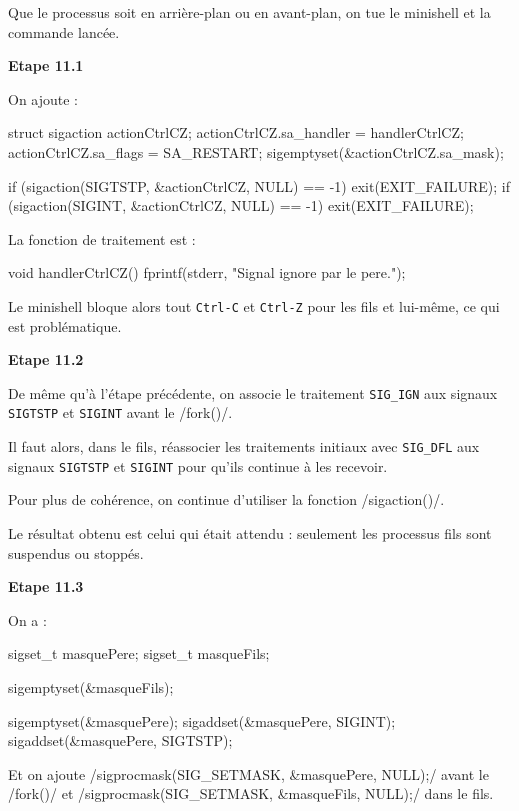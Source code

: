 \documentclass[a4paper, 12pt]{article}
\begin{document}
\bigskip
Que le processus soit en arrière-plan ou en avant-plan, on tue le minishell et la commande lancée.

\newpage
\noindent
\textbf{Etape 11.1}

\bigskip
On ajoute :

\begin{ccode}
struct sigaction actionCtrlCZ;
actionCtrlCZ.sa_handler = handlerCtrlCZ;
actionCtrlCZ.sa_flags = SA_RESTART;
sigemptyset(&actionCtrlCZ.sa_mask);

if (sigaction(SIGTSTP, &actionCtrlCZ, NULL) == -1) {
	exit(EXIT_FAILURE);
}
if (sigaction(SIGINT, &actionCtrlCZ, NULL) == -1) {
	exit(EXIT_FAILURE);
}
\end{ccode}

La fonction de traitement est :

\begin{ccode}
void handlerCtrlCZ() {
	fprintf(stderr, "Signal ignore par le pere.");
}
\end{ccode}

Le minishell bloque alors tout \texttt{Ctrl-C} et \texttt{Ctrl-Z} pour les fils et lui-même, ce qui est problématique.

\bigskip
\noindent
\textbf{Etape 11.2}

\bigskip
De même qu'à l'étape précédente, on associe le traitement \texttt{SIG\_IGN} aux signaux \texttt{SIGTSTP} et \texttt{SIGINT} avant le \cinline/fork()/.

Il faut alors, dans le fils, réassocier les traitements initiaux avec \texttt{SIG\_DFL} aux signaux \texttt{SIGTSTP} et \texttt{SIGINT} pour qu'ils continue à les recevoir.

Pour plus de cohérence, on continue d'utiliser la fonction \cinline/sigaction()/.

\bigskip
Le résultat obtenu est celui qui était attendu : seulement les processus fils sont suspendus ou stoppés.

\bigskip
\noindent
\textbf{Etape 11.3}

\bigskip
On a :

\begin{ccode}
sigset_t masquePere;
sigset_t masqueFils;

sigemptyset(&masqueFils);

sigemptyset(&masquePere);
sigaddset(&masquePere, SIGINT);
sigaddset(&masquePere, SIGTSTP);
\end{ccode}

Et on ajoute \cinline/sigprocmask(SIG_SETMASK, &masquePere, NULL);/ avant le \cinline/fork()/ et \cinline/sigprocmask(SIG_SETMASK, &masqueFils, NULL);/ dans le fils.
\end{document}
